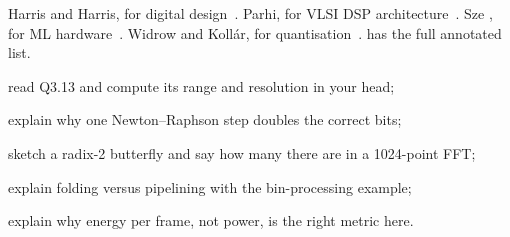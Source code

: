 \begin{readbox}
Harris and Harris, for digital design~\cite{harris2021ddca}. Parhi, for VLSI
DSP architecture~\cite{parhi1999vlsidsp}. Sze \etal, for ML
hardware~\cite{sze2017efficient}. Widrow and Koll\'ar, for
quantisation~\cite{widrow2008quantization}.  has the full
annotated list.
\end{readbox}

\begin{donebox}
\begin{checklist}
  \item read Q3.13 and compute its range and resolution in your head;
  \item explain why one Newton--Raphson step doubles the correct bits;
  \item sketch a radix-2 butterfly and say how many there are in a 1024-point FFT;
  \item explain folding versus pipelining with the bin-processing example;
  \item explain why energy per frame, not power, is the right metric here.
\end{checklist}
\end{donebox}
